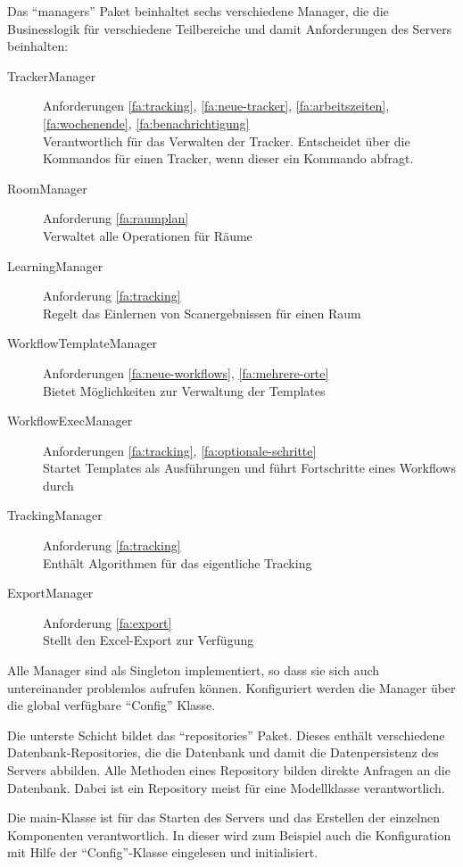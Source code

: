 Das \enquote{managers} Paket beinhaltet sechs verschiedene Manager, die die Businesslogik für verschiedene Teilbereiche 
und damit Anforderungen des Servers beinhalten:
\begin{description}
	\item[TrackerManager] Anforderungen \ref{fa:tracking}, \ref{fa:neue-tracker}, \ref{fa:arbeitszeiten}, \ref{fa:wochenende}, \ref{fa:benachrichtigung} \hfill \\
		Verantwortlich für das Verwalten der Tracker. Entscheidet über die Kommandos für einen Tracker, wenn dieser ein Kommando abfragt.
	\item[RoomManager] Anforderung \ref{fa:raumplan} \hfill \\
		Verwaltet alle Operationen für Räume
	\item[LearningManager] Anforderung \ref{fa:tracking} \hfill \\
		Regelt das Einlernen von Scanergebnissen für einen Raum
	\item[WorkflowTemplateManager] Anforderungen \ref{fa:neue-workflows}, \ref{fa:mehrere-orte} \hfill \\
		Bietet Möglichkeiten zur Verwaltung der Templates
	\item[WorkflowExecManager] Anforderungen \ref{fa:tracking}, \ref{fa:optionale-schritte} \hfill \\
		Startet Templates als Ausführungen und führt Fortschritte eines Workflows durch
	\item[TrackingManager] Anforderung \ref{fa:tracking} \hfill \\
		Enthält Algorithmen für das eigentliche Tracking
	\item[ExportManager] Anforderung \ref{fa:export} \hfill \\
		Stellt den Excel-Export zur Verfügung
\end{description}
Alle Manager sind als Singleton implementiert, so dass sie sich auch untereinander problemlos aufrufen können.
Konfiguriert werden die Manager über die global verfügbare \enquote{Config} Klasse.

Die unterste Schicht bildet das \enquote{repositories} Paket.
Dieses enthält verschiedene Datenbank-Repositories, die die Datenbank und damit die Datenpersistenz des Servers abbilden.
Alle Methoden eines Repository bilden direkte Anfragen an die Datenbank.
Dabei ist ein Repository meist für eine Modellklasse verantwortlich.

Die main-Klasse ist für das Starten des Servers und das Erstellen der einzelnen Komponenten verantwortlich.
In dieser wird zum Beispiel auch die Konfiguration mit Hilfe der \enquote{Config}-Klasse eingelesen und initialisiert.

